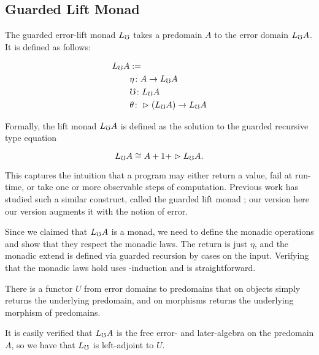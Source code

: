 \subsection{Guarded Lift Monad}\label{sec:guarded-lift-monad}

The guarded error-lift monad $L_\mho$ takes a predomain $A$ to the error domain $L_\mho A$.
It is defined as follows:

\begin{align*}
  L_\mho A &:= \\
  &\eta \colon A \to L_\mho A \\
  &\mho \colon L_\mho A \\
  &\theta \colon \vartriangleright (L_\mho A) \to L_\mho A
\end{align*}

Formally, the lift monad $L_\mho A$ is defined as the solution to the guarded recursive type equation

\[ L_\mho A \cong A + 1 + \vartriangleright L_\mho A. \]

This captures the intuition that a program may either return a value,
fail at run-time, or take one or more observable steps of computation.
Previous work has studied such a similar construct, called the guarded lift
monad \cite{mogelberg-paviotti2016}; our version here our version augments it with the notion of error.

Since we claimed that $L_\mho A$ is a monad, we need to define the monadic operations
and show that they respect the monadic laws. The return is just $\eta$, and the monadic extend
is defined via guarded recursion by cases on the input.
Verifying that the monadic laws hold uses \lob-induction and is straightforward.


There is a functor $U$ from error domains to predomains that on objects simply returns the
underlying predomain, and on morphisms returns the underlying morphism of predomains.
%

It is easily verified that $L_\mho A$ is the free error- and later-algebra on the predomain $A$,
so we have that $L_\mho$ is left-adjoint to $U$.


